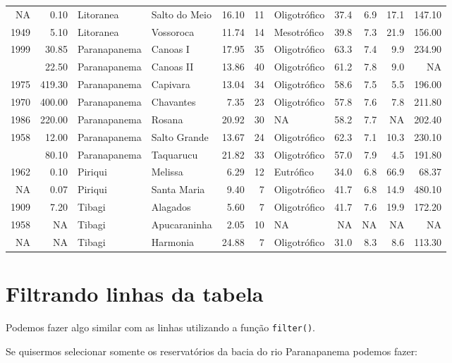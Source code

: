 \documentclass[
]{book}
\begin{document}
\begin{table}
\begin{tabular}{rrllrrlrrrr}
NA & 0.10 & Litoranea & Salto do Meio & 16.10 & 11 & Oligotrófico & 37.4 & 6.9 & 17.1 & 147.10\\
1949 & 5.10 & Litoranea & Vossoroca & 11.74 & 14 & Mesotrófico & 39.8 & 7.3 & 21.9 & 156.00\\
1999 & 30.85 & Paranapanema & Canoas I & 17.95 & 35 & Oligotrófico & 63.3 & 7.4 & 9.9 & 234.90\\
\addlinespace
1992 & 22.50 & Paranapanema & Canoas II & 13.86 & 40 & Oligotrófico & 61.2 & 7.8 & 9.0 & NA\\
1975 & 419.30 & Paranapanema & Capivara & 13.04 & 34 & Oligotrófico & 58.6 & 7.5 & 5.5 & 196.00\\
1970 & 400.00 & Paranapanema & Chavantes & 7.35 & 23 & Oligotrófico & 57.8 & 7.6 & 7.8 & 211.80\\
1986 & 220.00 & Paranapanema & Rosana & 20.92 & 30 & NA & 58.2 & 7.7 & NA & 202.40\\
1958 & 12.00 & Paranapanema & Salto Grande & 13.67 & 24 & Oligotrófico & 62.3 & 7.1 & 10.3 & 230.10\\
\addlinespace
1989 & 80.10 & Paranapanema & Taquarucu & 21.82 & 33 & Oligotrófico & 57.0 & 7.9 & 4.5 & 191.80\\
1962 & 0.10 & Piriqui & Melissa & 6.29 & 12 & Eutrófico & 34.0 & 6.8 & 66.9 & 68.37\\
NA & 0.07 & Piriqui & Santa Maria & 9.40 & 7 & Oligotrófico & 41.7 & 6.8 & 14.9 & 480.10\\
1909 & 7.20 & Tibagi & Alagados & 5.60 & 7 & Oligotrófico & 41.7 & 7.6 & 19.9 & 172.20\\
1958 & NA & Tibagi & Apucaraninha & 2.05 & 10 & NA & NA & NA & NA & NA\\
\addlinespace
NA & NA & Tibagi & Harmonia & 24.88 & 7 & Oligotrófico & 31.0 & 8.3 & 8.6 & 113.30\\
\bottomrule
\end{tabular}
\endgroup{}
\end{table}

\hypertarget{filtrando-linhas-da-tabela}{%
\section{Filtrando linhas da tabela}\label{filtrando-linhas-da-tabela}}

Podemos fazer algo similar com as linhas utilizando a função \texttt{filter()}.

Se quisermos selecionar somente os reservatórios da bacia do rio Paranapanema podemos fazer:
\end{document}
